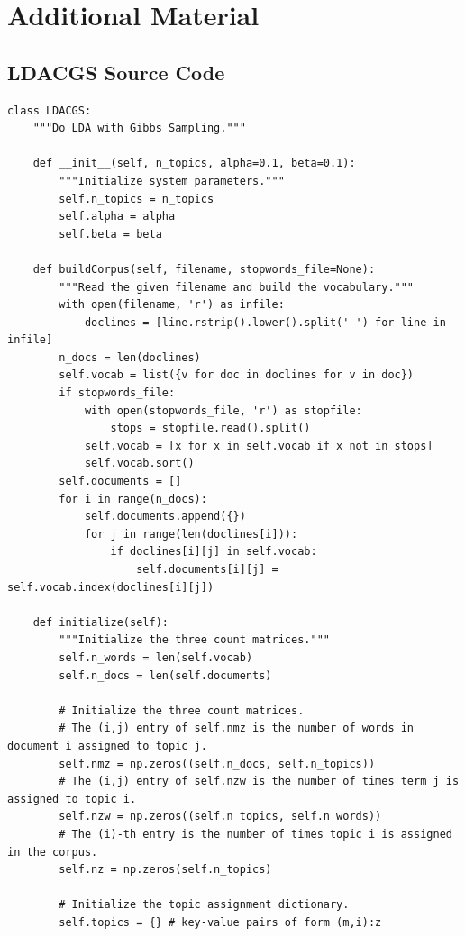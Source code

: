 \newpage

\section*{Additional Material} %

\subsection*{LDACGS Source Code} %

\begin{lstlisting}
class LDACGS:
    """Do LDA with Gibbs Sampling."""

    def __init__(self, n_topics, alpha=0.1, beta=0.1):
        """Initialize system parameters."""
        self.n_topics = n_topics
        self.alpha = alpha
        self.beta = beta

    def buildCorpus(self, filename, stopwords_file=None):
        """Read the given filename and build the vocabulary."""
        with open(filename, 'r') as infile:
            doclines = [line.rstrip().lower().split(' ') for line in infile]
        n_docs = len(doclines)
        self.vocab = list({v for doc in doclines for v in doc})
        if stopwords_file:
            with open(stopwords_file, 'r') as stopfile:
                stops = stopfile.read().split()
            self.vocab = [x for x in self.vocab if x not in stops]
            self.vocab.sort()
        self.documents = []
        for i in range(n_docs):
            self.documents.append({})
            for j in range(len(doclines[i])):
                if doclines[i][j] in self.vocab:
                    self.documents[i][j] = self.vocab.index(doclines[i][j])

    def initialize(self):
        """Initialize the three count matrices."""
        self.n_words = len(self.vocab)
        self.n_docs = len(self.documents)

        # Initialize the three count matrices.
        # The (i,j) entry of self.nmz is the number of words in document i assigned to topic j.
        self.nmz = np.zeros((self.n_docs, self.n_topics))
        # The (i,j) entry of self.nzw is the number of times term j is assigned to topic i.
        self.nzw = np.zeros((self.n_topics, self.n_words))
        # The (i)-th entry is the number of times topic i is assigned in the corpus.
        self.nz = np.zeros(self.n_topics)

        # Initialize the topic assignment dictionary.
        self.topics = {} # key-value pairs of form (m,i):z


\end{lstlisting}
